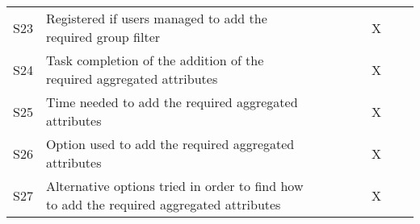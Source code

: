 \begin{longtable}{@{}lm{7cm}ccccccc@{}}
    S23         & Registered if users managed to add the required group filter                                                                                            &                                                &                                                &                                                &                                                & X                                              &                                                &                                                \\
    S24         & Task completion of the addition of the required aggregated attributes                                                                                                   &                                                &                                                &                                                &                                                & X                                              &                                                &                                                \\
    S25         & Time needed to add the required aggregated attributes                                                                                                   &                                                &                                                &                                                &                                                & X                                              &                                                &                                                \\
    S26         & Option used to add the required aggregated attributes                                                                                                   &                                                &                                                &                                                &                                                & X                                              &                                                &                                                \\
    S27         & Alternative options tried in order to find how to add the required aggregated attributes                                                                &                                                &                                                &                                                &                                                & X                                              &                                                &                                                \\

\end{longtable}
